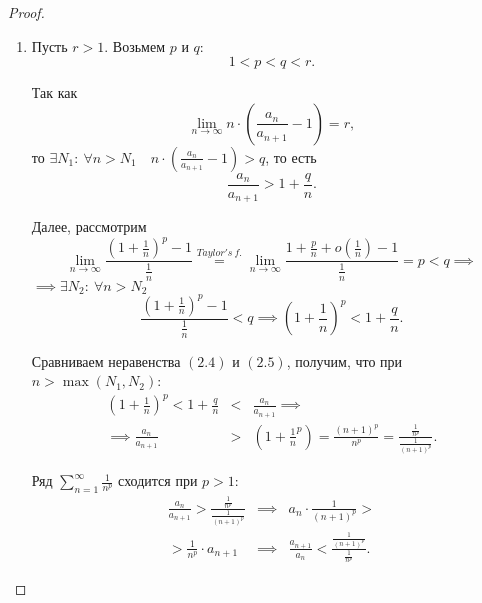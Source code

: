 \documentclass{report}
\theoremstyle{definition}
\begin{document}
\begin{proof}
  \begin{enumerate}
    \item Пусть $r>1$. Возьмем $p$ и $q$:
          \begin{equation*}
            1 < p < q < r.
          \end{equation*}

          Так как
          \begin{equation*}
            \underset{n\rightarrow\infty}{\lim}n\cdot(\frac{a_n}{a_{n+1}} - 1) = r,
          \end{equation*}
          то $\exists N_1: \ \forall n > N_1 \quad n\cdot(\frac{a_n}{a_{n+1}} - 1) > q$, то есть
          \begin{equation}
            \frac{a_n}{a_{n+1}} > 1 + \frac{q}{n}.
          \end{equation}

          Далее, рассмотрим
          \begin{equation*}
            \underset{n\rightarrow\infty}{\lim}\frac{(1 + \frac{1}{n})^p - 1}{\frac{1}{n}} \overset{Taylor's \ f.}{=} \underset{n\rightarrow\infty}{\lim}\frac{1 + \frac{p}{n} + o(\frac{1}{n}) - 1}{\frac{1}{n}} = p < q \implies
          \end{equation*}
          $\implies \exists N_2: \ \forall n > N_2$
          \begin{equation}
            \frac{(1 + \frac{1}{n})^p - 1}{\frac{1}{n}} < q \implies (1 + \frac{1}{n})^p < 1 + \frac{q}{n}.
          \end{equation}

          Сравниваем неравенства $(2.4)$ и $(2.5)$, получим, что при $n > \max(N_1,N_2)$:
          \begin{eqnarray*}
            (1 + \frac{1}{n})^p < 1 + \frac{q}{n} & < & \frac{a_n}{a_{n+1}} \implies \\
            \implies \frac{a_n}{a_{n+1}} & > & (1 + \frac{1}{n}^p) = \frac{(n+1)^p}{n^p} = \frac{\frac{1}{n^p}}{\frac{1}{(n+1)^p}}.
          \end{eqnarray*}

          Ряд $\sum_{n=1}^{\infty}\frac{1}{n^p}$ сходится при $p > 1$:
          \begin{eqnarray*}
            \frac{a_n}{a_{n+1}} > \frac{\frac{1}{n^p}}{\frac{1}{(n+1)^p}} & \implies & a_n \cdot \frac{1}{(n+1)^p} > \\
            > \frac{1}{n^p} \cdot a_{n+1} & \implies & \frac{a_{n+1}}{a_n} < \frac{\frac{1}{(n+1)^p}}{\frac{1}{n^p}}.
          \end{eqnarray*}


\end{enumerate}
\end{proof}
\end{document}
